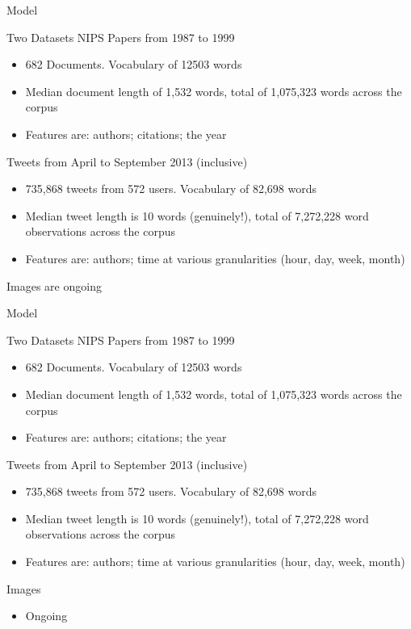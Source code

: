 \documentclass[xcolor=dvipsnames]{beamer}
\begin{document}
\begin{frame}{Model}

Two Datasets
NIPS Papers from 1987 to 1999
\begin{itemize}
    \item 682 Documents. Vocabulary of 12503 words
    \item Median document length of 1,532 words, total of 1,075,323 words across the corpus
    \item Features are: authors; citations; {\color{gray} the year}
\end{itemize}

Tweets from April to September 2013 (inclusive)
\begin{itemize}
    \item 735,868 tweets from 572 users. Vocabulary of 82,698 words
    \item Median tweet length is 10 words (genuinely!), total of 7,272,228 word observations across the corpus 
    \item Features are: authors; time at various granularities (hour, day, week, month)
\end{itemize}

Images are ongoing

\end{frame}


\begin{frame}{Model}

Two Datasets
NIPS Papers from 1987 to 1999
\begin{itemize}
    \item 682 Documents. Vocabulary of 12503 words
    \item Median document length of 1,532 words, total of 1,075,323 words across the corpus
    \item Features are: authors; citations; {\color{gray} the year}
\end{itemize}

Tweets from April to September 2013 (inclusive)
\begin{itemize}
    \item 735,868 tweets from 572 users. Vocabulary of 82,698 words
    \item Median tweet length is 10 words (genuinely!), total of 7,272,228 word observations across the corpus 
    \item Features are: authors; time at various granularities (hour, day, week, month)
\end{itemize}

Images
\begin{itemize}
    \item Ongoing
\end{itemize}

\end{frame}
\end{document}
